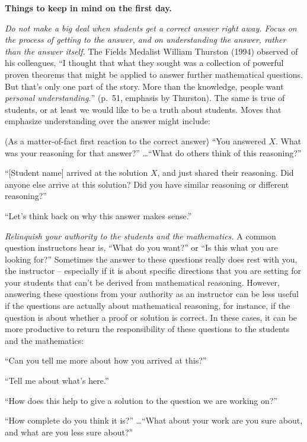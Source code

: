 \documentclass[11pt]{article}
\newenvironment{bignote}[1][Instructor note]%
	{\begin{mdframed}\raggedright{\bf #1.~}}
	{\end{mdframed}}
\theoremstyle{definition}
\begin{document}
\begin{bignote}[Things to keep in mind on the first day]
\begin{itemize*}
	\item {\it Do not make a big deal when students get a correct answer right away.  Focus on the process of getting to the answer, and on understanding the answer, rather than the answer itself.}  The Fields Medalist William Thurston (1994) observed of his colleagues, ``I thought that what they sought was a collection of powerful proven theorems that might be applied to answer further mathematical questions. But that's only one part of the story. More than the knowledge,
people want {\it personal understanding.}'' (p.~51, emphasis by Thurston). The same is true of students, or at least we would like to be a truth about students. Moves that emphasize understanding over the answer might include:
		\begin{itemize*}
		\item (As a matter-of-fact first reaction to the correct answer) ``You answered $X$. What was your reasoning for that answer?''  \dots ``What do others think of this reasoning?'' 
		\item ``[Student name] arrived at the solution $X$, and just shared their reasoning. Did anyone else arrive at this solution? Did you have similar reasoning or different reasoning?'' 
		\item ``Let's think back on why this answer makes sense.''
		\end{itemize*} 
	\item {\it Relinquish your authority to the students and the mathematics.} A common question instructors hear is, ``What do you want?'' or ``Is this what you are looking for?'' Sometimes the answer to these questions really does rest with you, the instructor -- especially if it is about specific directions that you are setting for your students that can't be derived from mathematical reasoning. However, answering these questions from your authority as an instructor can be less useful if the questions are actually about mathematical reasoning, for instance, if the question is about whether a proof or solution is correct. In these cases, it can be more productive to return the responsibility of these questions to the students and the mathematics:
		\begin{itemize*}
		\item ``Can you tell me more about how you arrived at this?''
		\item ``Tell me about what's here.''
		\item ``How does this help to give a solution to the question we are working on?'' 
		\item ``How complete do you think it is?'' \dots ``What about your work are you sure about, and what are you less sure about?''
		\end{itemize*}
	

\end{itemize*}
\end{bignote}
\end{document}
